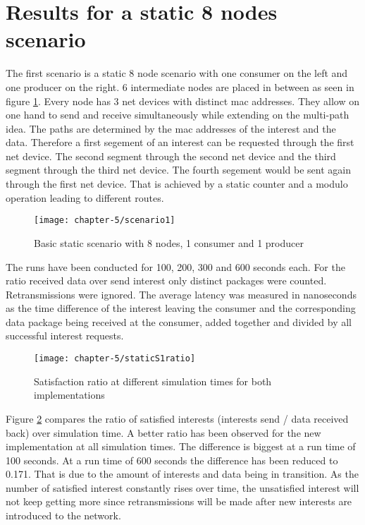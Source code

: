 \section{Results for a static 8 nodes scenario}

The first scenario is a static 8 node scenario with one consumer on the left and one producer on the right. 6 intermediate nodes are placed in between as seen in figure \ref{fig:scenario1}. Every node has 3 net devices with distinct mac addresses. They allow on one hand to send and receive simultaneously while extending on the multi-path idea. The paths are determined by the mac addresses of the interest and the data. Therefore a first segement of an interest can be requested through the first net device. The second segment through the second net device and the third segment through the third net device. The fourth segement would be sent again through the first net device. That is achieved by a static counter and a modulo operation leading to different routes.

\begin{figure}[H]
  \centering
  \texttt{[image: chapter-5/scenario1]}
  \caption{Basic static scenario with 8 nodes, 1 consumer and 1 producer}
  \label{fig:scenario1}
\end{figure}

The runs have been conducted for 100, 200, 300 and 600 seconds each. For the ratio received data over send interest only distinct packages were counted. Retransmissions were ignored. The average latency was measured in nanoseconds as the time difference of the interest leaving the consumer and the corresponding data package being received at the consumer, added together and divided by all successful interest requests.

\begin{figure}[H]
  \centering
  \texttt{[image: chapter-5/staticS1ratio]}
  \caption{Satisfaction ratio at different simulation times for both implementations}
  \label{fig:staticS1ratio}
\end{figure}

Figure \ref{fig:staticS1ratio} compares the ratio of satisfied interests (interests send / data received back) over simulation time. A better ratio has been observed for the new implementation at all simulation times. The difference is biggest at a run time of 100 seconds. At a run time of 600 seconds the difference has been reduced to 0.171. That is due to the amount of interests and data being in transition. As the number of satisfied interest constantly rises over time, the unsatisfied interest will not keep getting more since retransmissions will be made after new interests are introduced to the network.

